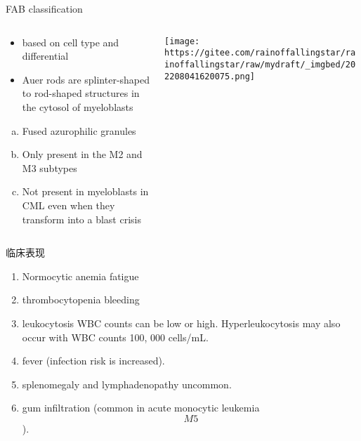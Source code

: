 \documentclass[
  ignorenonframetext,
]{beamer}
\begin{document}
\begin{frame}
\begin{block}{FAB classification}
\protect\hypertarget{fab-classification}{}
\begin{columns}[T]
\begin{column}{0.3\textwidth}
\begin{itemize}
\item
  based on cell type and differential
\item
  Auer rods are splinter-shaped to rod-shaped structures in the cytosol
  of myeloblasts
\end{itemize}

\begin{enumerate}
[(a)]
\item
  Fused azurophilic granules
\item
  Only present in the M2 and M3 subtypes
\item
  Not present in myeloblasts in CML even when they transform into a
  blast crisis
\end{enumerate}
\end{column}

\begin{column}{0.7\textwidth}
\texttt{[image: https://gitee.com/rainoffallingstar/rainoffallingstar/raw/mydraft/\_imgbed/202208041620075.png]}
\end{column}
\end{columns}
\end{block}
\end{frame}

\begin{frame}
\begin{block}{临床表现}
\protect\hypertarget{ux4e34ux5e8aux8868ux73b0-5}{}
\begin{enumerate}
\item
  Normocytic anemia fatigue
\item
  thrombocytopenia bleeding
\item
  leukocytosis WBC counts can be low or high. Hyperleukocytosis may also
  occur with WBC counts 100, 000 cells/mL.
\item
  fever (infection risk is increased).
\item
  splenomegaly and lymphadenopathy uncommon.
\item
  gum infiltration (common in acute monocytic leukemia \[M5\]).
\end{enumerate}
\end{block}
\end{frame}
\end{document}
